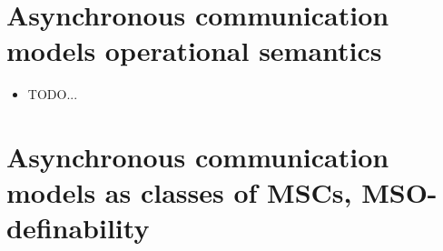 \documentclass[acmsmall,review,anonymous,screen]{acmart}\settopmatter{printfolios=true,printccs=false,printacmref=true}
\begin{document}




% 


\section{Asynchronous communication models operational semantics}\label{sec:impl}

\begin{itemize}
  \item TODO...
\end{itemize}

\section{Asynchronous communication models as classes of MSCs, MSO-definability}\label{sec:MSO}





%
\end{document}
